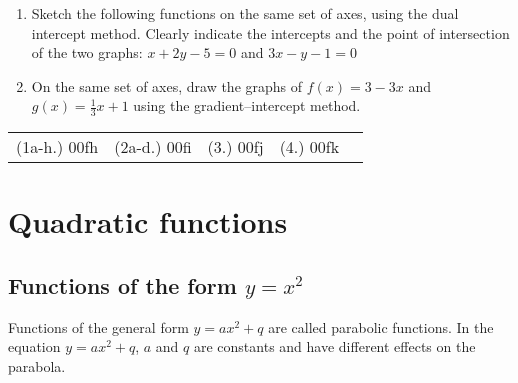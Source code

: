 \begin{exercises}{}
{\begin{enumerate}[noitemsep, label=\textbf{\arabic*}. ]
\item Sketch the following functions on the same set of axes, using the dual intercept method. Clearly indicate the intercepts and the point of intersection of the two graphs: $x+2y-5=0$ and $3x-y-1=0$
\item On the same set of axes, draw the graphs of $f(x)=3-3x$ and $g(x)=\frac{1}{3}x+1$ using the gradient--intercept method.
\end{enumerate}
\practiceinfo
\par 
\par \begin{tabular}[h]{ccccc}
(1a-h.) 00fh&  (2a-d.) 00fi&  (3.) 00fj& (4.) 00fk\end{tabular}
}
\end{exercises}
   


\section{Quadratic functions}

\subsection*{Functions of the form $y={x}^{2}$}       
Functions of the general form $y=a{x}^{2}+q$ are called parabolic functions. In the equation $y=a{x}^{2}+q$, $a$ and $q$ are constants and have different effects on the parabola. 
\par
{}

